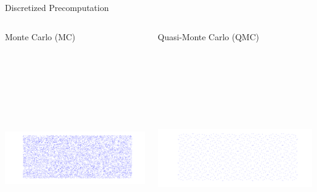 \documentclass[final]{beamer}
\begin{document}
\begin{frame}{}
{\begin{columns}[t]
\begin{column}{.30\linewidth}
\begin{block}{\centering Discretized Precomputation}
\begin{columns}[T]
\begin{column}{12cm}{\centering \scriptsize{Monte Carlo (MC)}}
\centering\includegraphics[height=10cm, width = 10cm]{figures/MCpoints}
\end{column}

\begin{column}{12cm}{\centering \scriptsize{Quasi-Monte Carlo (QMC)}}
\centering\includegraphics[height=10cm, width = 10cm]{figures/Sobolpoints}
\end{column}
\end{columns}

\vspace{0.5em}

\begin{columns}[T]


\end{columns}
\end{block}
\end{column}
\end{columns}}
\end{frame}
\end{document}
